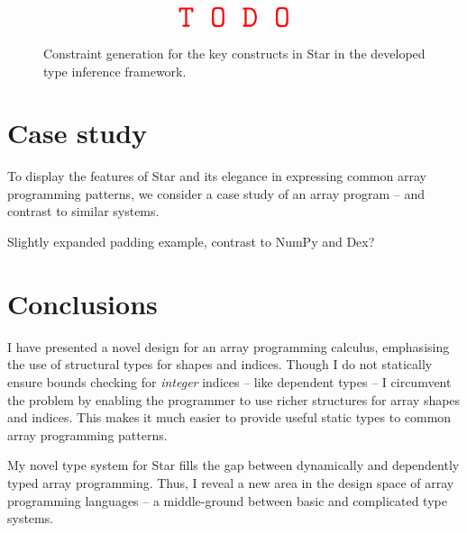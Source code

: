 \begin{figure}
    \centering
    \begin{align*}
        \color{red} \texttt{\Huge T O D O}
    \end{align*}
    \caption{Constraint generation for the key constructs in Star in the developed type inference framework.}
    \label{fig:star-type-constraints}
\end{figure}

\section{Case study}

To display the features of Star and its elegance in expressing common array programming patterns, we consider a case study of an array program -- and contrast to similar systems.

\begin{center}
    \color{red} Slightly expanded padding example, contrast to NumPy and Dex?
\end{center}

\section{Conclusions}

I have presented a novel design for an array programming calculus, emphasising the use of structural types for shapes and indices. 
Though I do not statically ensure bounds checking for \emph{integer} indices -- like dependent types -- I circumvent the problem by enabling the programmer to use richer structures for array shapes and indices. 
This makes it much easier to provide useful static types to common array programming patterns. 

My novel type system for Star fills the gap between dynamically and dependently typed array programming. Thus, I reveal a new area in the design space of array programming languages -- a middle-ground between basic and complicated type systems. 
 
